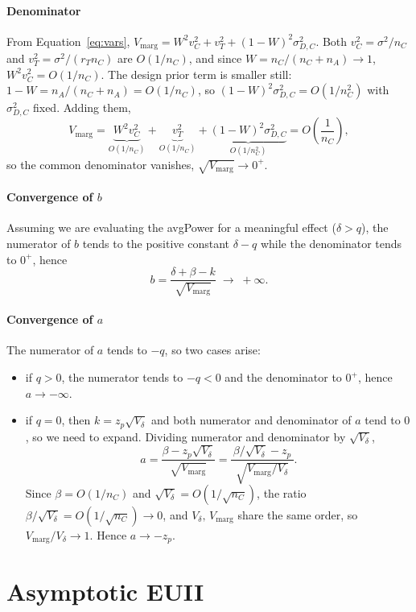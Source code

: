 \paragraph{Denominator} From Equation~\eqref{eq:vars}, $V_{\text{marg}} = W^2 v_C^2 + v_T^2 + (1 - W)^2 \sigma_{D,C}^2$. Both $v_C^2 = \sigma^2/n_C$ and $v_T^2 = \sigma^2/(r_T n_C)$ are $O(1/n_C)$, and since $W = n_C/(n_C+n_A) \to 1$, $W^2 v_C^2 = O(1/n_C)$. The 
design prior term is smaller still: $1 - W = n_A/(n_C+n_A) = O(1/n_C)$, so $(1 - W)^2 \sigma_{D,C}^2 = O(1/n_C^2)$ with $\sigma_{D,C}^2$ fixed. Adding them,
\[
  V_{\text{marg}}
  = \underbrace{W^2 v_C^2}_{O(1/n_C)}
  + \underbrace{v_T^2}_{O(1/n_C)}
  + \underbrace{(1 - W)^2 \sigma_{D,C}^2}_{O(1/n_C^2)}
  = O\!\left(\frac{1}{n_C}\right),
\]
so the common denominator vanishes, $\sqrt{V_{\text{marg}}} \to 0^+$.

\paragraph{Convergence of $b$} Assuming we are evaluating the avgPower for a meaningful effect ($\delta > q$), the numerator of $b$ tends to the positive constant $\delta - q$ while the denominator tends to $0^+$, hence
\[
  b = \frac{\delta + \beta - k}{\sqrt{V_{\text{marg}}}} \;\longrightarrow\; +\infty .
\]

\paragraph{Convergence of $a$} The numerator of $a$ tends to $-q$, so two cases arise:
\begin{itemize}
  \item if $q > 0$, the numerator tends to $-q < 0$ and the denominator to $0^+$, hence $a \to -\infty$.
  \item if $q = 0$, then $k = z_p\sqrt{V_\delta}$ and both numerator and denominator of $a$ tend to $0$, so we need to expand. Dividing numerator and denominator by $\sqrt{V_\delta}$,
  \[
    a = \frac{\beta - z_p \sqrt{V_\delta}}{\sqrt{V_{\text{marg}}}}
      = \frac{\,\beta/\sqrt{V_\delta} - z_p\,}{\sqrt{V_{\text{marg}}/V_\delta}} .
  \]
  Since $\beta = O(1/n_C)$ and $\sqrt{V_\delta} = O(1/\sqrt{n_C})$, the ratio $\beta/\sqrt{V_\delta} = O(1/\sqrt{n_C}) \to 0$, and $V_\delta,\,V_{\text{marg}}$ share the same order, so $V_{\text{marg}}/V_\delta \to 1$. Hence $a \to -z_p$.
\end{itemize}


\section{Asymptotic EUII}


